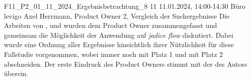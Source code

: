 \fieldnote
{F11\_P2\_01\_11\_2024\_Ergebnisbetrachtung\_8}
{11}
{11.01.2024, 14:00-14:30}
{Büro levigo}
{Axel Herrmann, Product Owner}
{2, Vergleich der Suchergebnisse}
{
  Die Arbeiten von ,  und  wurden dem Product Owner zusammengefasst und gemeinsam die Möglichkeit der Anwendung auf \emph{jadice flow} diskutiert.
  Dabei wurde eine Ordnung aller Ergebnisse hinsichtlich ihrer Nützlichkeit für diese Fallstudie vorgenommen, wobei immer noch  mit Platz 1 und  mit Platz 2 abschneiden.
}
{
}
{
  Der erste Eindruck des Product Owners stimmt mit der des Autors überein.
}
{}
{
}
